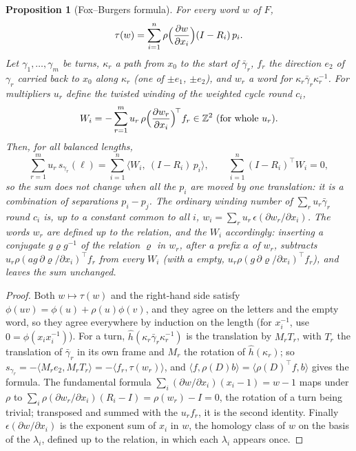 \documentclass[11pt,a4paper]{article}
\newtheorem{proposition}{Proposition}
\newcommand{\Z}{\mathbb{Z}}
\newcommand{\shift}{s}
\newcommand{\lean}[1]{\texttt{\detokenize{#1}}}
\newenvironment{evidence}[3][]{}{}
\begin{document}
\begin{evidence}{core}{\lean{fox_burgers}, \lean{fox_fundamental}, \lean{fox_burgers_combination}; assumed: the presentation of the fundamental group by the loops round the singular vertices}
\begin{proposition}[Fox--Burgers formula]\label{prop:fox}
For every word $w$ of $F$,
\[
  \tau(w) = \sum_{i=1}^n \rho\Bigl(\frac{\partial w}{\partial x_i}\Bigr)
  (I - R_i)\,p_i .
\]
Let $\gamma_1, \dots, \gamma_m$ be turns, $\kappa_r$ a path from $x_0$ to the
start of $\bar\gamma_r$, $f_r$ the direction $e_2$ of $\gamma_r$ carried back
to $x_0$ along $\kappa_r$ (one of $\pm e_1$, $\pm e_2$), and $w_r$ a word for
$\kappa_r \bar\gamma_r \kappa_r^{-1}$. For multipliers $u_r$ define the
\emph{twisted winding} of the weighted cycle round $c_i$,
\[
  W_i = -\sum_{r=1}^m u_r\, \rho\Bigl(\frac{\partial w_r}{\partial x_i}\Bigr)^{\!\top} f_r
  \in \Z^2 \text{ (for whole } u_r) .
\]
Then, for all balanced lengths,
\[
  \sum_{r=1}^m u_r\, \shift_{\gamma_r}(\ell) = \sum_{i=1}^n \bigl\langle W_i,\
  (I - R_i)\,p_i \bigr\rangle ,
  \qquad
  \sum_{i=1}^n (I - R_i)^\top W_i = 0 ,
\]
so the sum does not change when all the $p_i$ are moved by one translation: it
is a combination of separations $p_i - p_j$. The ordinary winding number of
$\sum_r u_r \bar\gamma_r$ round $c_i$ is, up to a constant common to all $i$,
$w_i = \sum_r u_r\, \epsilon(\partial w_r/\partial x_i)$. The words $w_r$ are
defined up to the relation, and the $W_i$ accordingly: inserting a conjugate
$g\varrho g^{-1}$ of the relation $\varrho$ in $w_r$, after a prefix $a$ of
$w_r$, subtracts $u_r \rho(a g\, \partial \varrho/\partial x_i)^\top f_r$ from
every $W_i$ (with $a$ empty, $u_r \rho(g\, \partial \varrho/\partial x_i)^\top f_r$),
and leaves the sum unchanged.
\end{proposition}
\end{evidence}

\begin{proof}
Both $w \mapsto \tau(w)$ and the right-hand side satisfy $\phi(uv) = \phi(u) +
\rho(u)\phi(v)$, and they agree on the letters and the empty word, so they
agree everywhere by induction on the length (for $x_i^{-1}$, use $0 =
\phi(x_i x_i^{-1})$). For a turn, $\hat h(\kappa_r \bar\gamma_r
\kappa_r^{-1})$ is the translation by $M_r T_r$, with $T_r$ the translation of
$\bar\gamma_r$ in its own frame and $M_r$ the rotation of $\hat h(\kappa_r)$;
so $\shift_{\gamma_r} = -\langle M_r e_2, M_r T_r \rangle = -\langle f_r,
\tau(w_r) \rangle$, and $\langle f, \rho(D) b\rangle = \langle \rho(D)^\top f,
b \rangle$ gives the formula. The fundamental formula $\sum_i (\partial
w/\partial x_i)(x_i - 1) = w - 1$ maps under $\rho$ to $\sum_i \rho(\partial
w_r/\partial x_i)(R_i - I) = \rho(w_r) - I = 0$, the rotation of a turn being
trivial; transposed and summed with the $u_r f_r$, it is the second identity.
Finally $\epsilon(\partial w/\partial x_i)$ is the exponent sum of $x_i$ in
$w$, the homology class of $w$ on the basis of the $\lambda_i$, defined up to
the relation, in which each $\lambda_i$ appears once.
\end{proof}
\end{document}
